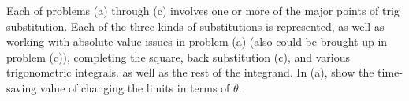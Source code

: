 \documentclass[noinstructornotes]{ximera}
\begin{document}
\begin{instructorNotes}
Each of problems (a) through (c) involves one or more of the major points of trig substitution.  
Each of the three kinds of substitutions is represented, as well as working with absolute value issues in problem (a) (also could be brought up in problem (c)), completing the square, back substitution (c), and various trigonometric integrals.  
 as well as the rest of the integrand.  
In  (a), show the time-saving value of changing the limits in terms of $\theta$.  
\end{instructorNotes}















	
	
	
	
	
	
	
	
	

	










								
				
				
	
\end{document}
